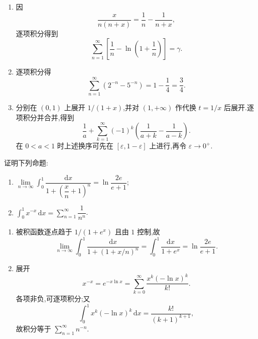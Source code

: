 \begin{solution}
    \leavevmode
    \begin{enumerate}
        \item 因
              \[
                  \dfrac{x}{n(n+x)}=\dfrac{1}{n}-\dfrac{1}{n+x},
              \]
              逐项积分得到
              \[
                  \displaystyle\sum\limits_{n=1}^{\infty}\left[\dfrac{1}{n}-\ln\left(1+\dfrac{1}{n}\right)\right]=\gamma.
              \]
        \item 逐项积分得
              \[
                  \displaystyle\sum\limits_{n=1}^{\infty}(2^{-n}-5^{-n})=1-\dfrac{1}{4}=\dfrac{3}{4}.
              \]
        \item 分别在 $(0,1)$ 上展开 $1/(1+x)$,并对 $(1,+\infty)$ 作代换 $t=1/x$ 后展开.逐项积分并合并,得到
              \[
                  \dfrac{1}{a}+\sum\limits_{k=1}^{\infty}(-1)^k
                  \left(\dfrac{1}{a+k}-\dfrac{1}{a-k}\right).
              \]
              在 $0<a<1$ 时上述换序可先在 $[\varepsilon,1-\varepsilon]$ 上进行,再令 $\varepsilon\to0^+$.
    \end{enumerate}
\end{solution}

\begin{example}
    证明下列命题:
    \begin{enumerate}
        \item $\displaystyle\lim\limits_{n\to\infty}\int_0^1\dfrac{\mathrm{d}x}{1+\left(\dfrac{x}{n}+1\right)^n}=\ln\dfrac{2e}{e+1}$;
        \item $\displaystyle\int_0^1x^{-x}\,\mathrm{d}x=\sum\limits_{n=1}^{\infty}\dfrac{1}{n^n}$.
    \end{enumerate}
\end{example}
\exampleblank

\begin{solution}
    \leavevmode
    \begin{enumerate}
        \item 被积函数逐点趋于 $1/(1+e^x)$ 且由 $1$ 控制,故
              \[
                  \displaystyle\lim\limits_{n\to\infty}\int_0^1\dfrac{\mathrm{d}x}{1+(1+x/n)^n}
                  =\int_0^1\dfrac{\mathrm{d}x}{1+e^x}
                  =\ln\dfrac{2e}{e+1}.
              \]
        \item 展开
              \[
                  x^{-x}=e^{-x\ln x}
                  =\sum\limits_{k=0}^{\infty}\dfrac{x^k(-\ln x)^k}{k!}.
              \]
              各项非负,可逐项积分;又
              \[
                  \displaystyle\int_0^1x^k(-\ln x)^k\,\mathrm{d}x=\dfrac{k!}{(k+1)^{k+1}},
              \]
              故积分等于 $\displaystyle\sum_{n=1}^{\infty}n^{-n}$.
    \end{enumerate}
\end{solution}

